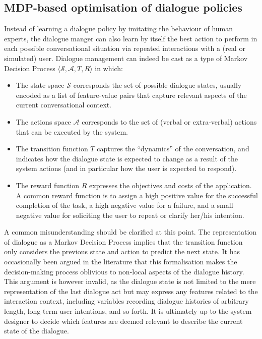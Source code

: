 
\subsection{MDP-based optimisation of dialogue policies}

Instead of learning a dialogue policy by imitating the behaviour of human experts, the dialogue manger can also learn by itself the best action to perform in each possible conversational situation via repeated interactions with a (real or simulated) user.  Dialogue management can indeed be cast as a type of Markov Decision Process $\langle \mathcal{S}, \mathcal{A}, T, R \rangle$ in which: 
\begin{itemize}
\item The state space $\mathcal{S}$ corresponds the set of possible dialogue states, usually encoded as a list of feature-value pairs that capture relevant aspects of the current conversational context.
\item The actions space $\mathcal{A}$ corresponds to the set of (verbal or extra-verbal) actions that can be executed by the system.
\item The transition function $T$ captures the ``dynamics'' of the conversation, and indicates how the dialogue state is expected to change as a result of the system actions (and in particular how the user is expected to respond). 
\item The reward function $R$ expresses the objectives and costs of the application. A common reward function is to assign a high positive value for the successful completion of the task, a high negative value for a failure, and a small negative value for soliciting the user to repeat or clarify her/his intention.  
\end{itemize}

A common misunderstanding should be clarified at this point. The representation of dialogue as a Markov Decision Process implies that the transition function only considers the previous state and action to predict the next state.  It has occasionally been argued in the literature that this formalisation makes the decision-making process oblivious to non-local aspects of the dialogue history. This argument is however invalid, as the dialogue state is not limited to the mere representation of the last dialogue act but may express any features related to the interaction context, including variables recording dialogue histories of arbitrary length, long-term user intentions, and so forth.  It is ultimately up to the system designer to decide which features are deemed relevant to describe the current state of the dialogue. 

